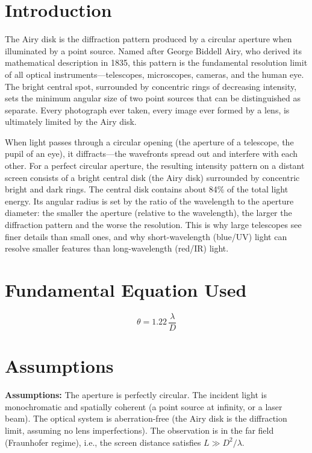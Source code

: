 \documentclass[11pt,openright]{book}
\begin{document}
\section*{Introduction}

The Airy disk is the diffraction pattern produced by a circular aperture when illuminated by a point source. Named after George Biddell Airy, who derived its mathematical description in 1835, this pattern is the fundamental resolution limit of all optical instruments---telescopes, microscopes, cameras, and the human eye. The bright central spot, surrounded by concentric rings of decreasing intensity, sets the minimum angular size of two point sources that can be distinguished as separate. Every photograph ever taken, every image ever formed by a lens, is ultimately limited by the Airy disk.

When light passes through a circular opening (the aperture of a telescope, the pupil of an eye), it diffracts---the wavefronts spread out and interfere with each other. For a perfect circular aperture, the resulting intensity pattern on a distant screen consists of a bright central disk (the Airy disk) surrounded by concentric bright and dark rings. The central disk contains about 84\% of the total light energy. Its angular radius is set by the ratio of the wavelength to the aperture diameter: the smaller the aperture (relative to the wavelength), the larger the diffraction pattern and the worse the resolution. This is why large telescopes see finer details than small ones, and why short-wavelength (blue/UV) light can resolve smaller features than long-wavelength (red/IR) light.
\section*{Fundamental Equation Used}

\begin{equation}
\theta = 1.22\,\frac{\lambda}{D}
\end{equation}
\section*{Assumptions}

\textbf{Assumptions:} The aperture is perfectly circular. The incident light is monochromatic and spatially coherent (a point source at infinity, or a laser beam). The optical system is aberration-free (the Airy disk is the diffraction limit, assuming no lens imperfections). The observation is in the far field (Fraunhofer regime), i.e., the screen distance satisfies $L \gg D^2/\lambda$.
\end{document}
